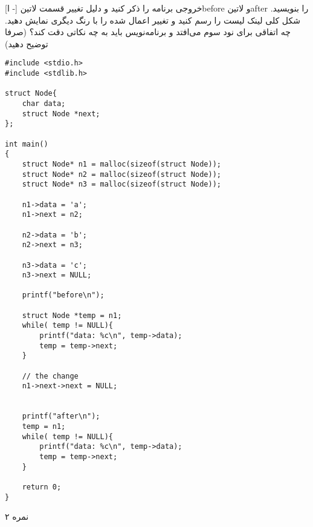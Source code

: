 \documentclass[../main.tex]{subfiles}
\begin{document}

[ا -]
     خروجی برنامه را ذکر کنید و دلیل تغییر قسمت ‌لاتین{before} و ‌لاتین{after} را بنویسید.
     شکل کلی لینک لیست را رسم کنید و تغییر اعمال شده را با رنگ دیگری نمایش دهید.
     چه اتفاقی برای نود سوم می‌افتد و برنامه‌نویس باید به چه نکاتی دقت کند؟ (صرفا توضیح دهید)

\begin{latin}
\begin{verbatim}
#include <stdio.h>
#include <stdlib.h>

struct Node{
    char data;
    struct Node *next;
};

int main()
{
    struct Node* n1 = malloc(sizeof(struct Node));
    struct Node* n2 = malloc(sizeof(struct Node));
    struct Node* n3 = malloc(sizeof(struct Node));

    n1->data = 'a';
    n1->next = n2;

    n2->data = 'b';
    n2->next = n3;

    n3->data = 'c';
    n3->next = NULL;

    printf("before\n");

    struct Node *temp = n1;
    while( temp != NULL){
        printf("data: %c\n", temp->data);
        temp = temp->next;
    }

    // the change
    n1->next->next = NULL;


    printf("after\n");
    temp = n1;
    while( temp != NULL){
        printf("data: %c\n", temp->data);
        temp = temp->next;
    }

    return 0;
}
\end{verbatim}
\end{latin}

۲ نمره
\end{document}
